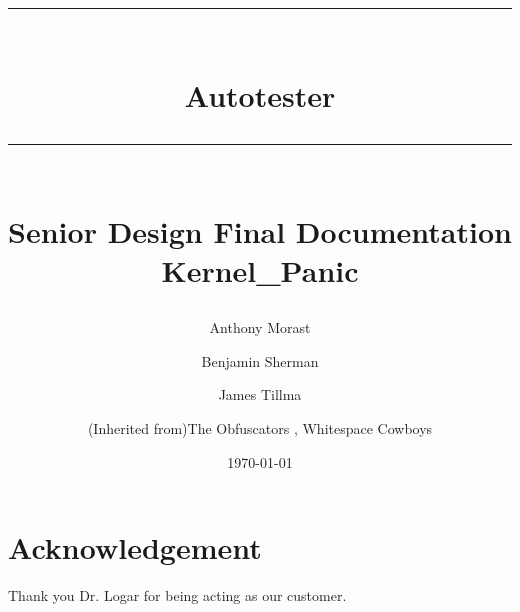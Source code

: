 \documentclass{book}
\title{{\color{MSBlue1} \rule{\linewidth}{0.5mm}}\\[2mm] {\huge \bfseries \color{MSBlue1} Autotester }\\[-1mm] {\color{MSBlue1}\rule{\linewidth}{0.5mm}} \\  \vfill
{\LARGE \bfseries \color{MSBlue2} Senior Design Final Documentation }\\  \vfill 
{\color{MSBlue1} Kernel\_Panic} }
\author{\color{MSBlue1}  Anthony Morast \and \color{MSBlue1} Benjamin Sherman\and  \color{MSBlue1} James Tillma \and  \color{MSBlue1} (Inherited from)The Obfuscators , Whitespace Cowboys}
\date{\color{MSBlue1} \today}
\begin{document}
\frontmatter
\maketitle


\tableofcontents
\listoffigures
\listoftables
\listofalgorithms




 
\mainmatter













\backmatter
\chapter{Acknowledgement}
\label{SpecialThanks}  Thank you Dr. Logar for being acting as our customer. 

%
\setcounter{section}{0}



\setcounter{section}{0}
%


%
%
\end{document}
